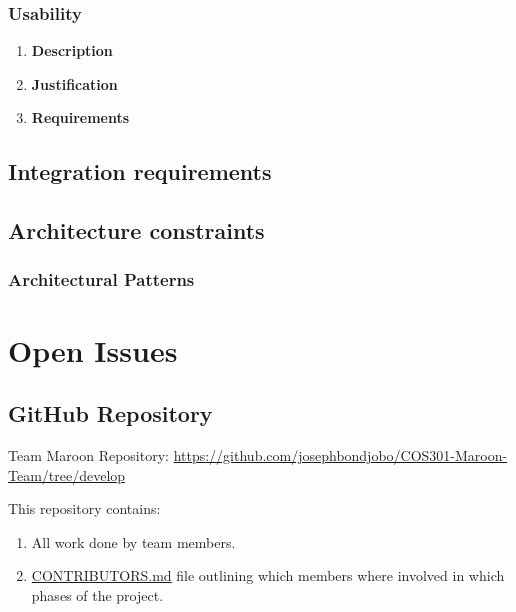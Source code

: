 \documentclass[a4paper,10pt]{article}
\begin{document}
\subsubsection{Usability}
\begin{enumerate}
\item \textbf{Description} \\
\item \textbf{Justification} \\
\item \textbf{Requirements}
\end{enumerate}

\subsection{Integration requirements}

\subsection{Architecture constraints}

\subsubsection{Architectural Patterns}

\clearpage
\section{Open Issues}
\subsection {GitHub Repository}
Team Maroon Repository: \url{https://github.com/josephbondjobo/COS301-Maroon-Team/tree/develop}

This repository contains:
\begin{enumerate}
\item All work done by team members.
\item \href{https://github.com/josephbondjobo/COS301-Maroon-Team/blob/develop/Intro/Contributors.md}{CONTRIBUTORS.md} file outlining which members where involved in which phases of the project.
\end{enumerate}



\newpage
\clearpage
{}
\end{document}
